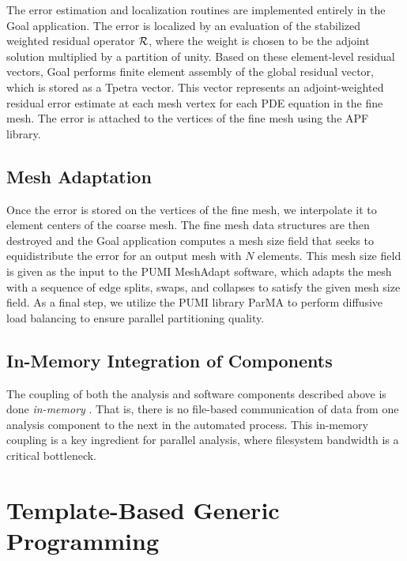 The error estimation and localization routines are implemented entirely in
the Goal application. The error is localized by an evaluation of the
stabilized weighted residual operator $\mathcal{R}$, where the weight is chosen to be
the adjoint solution multiplied by a partition of unity. Based on these
element-level residual vectors, Goal performs finite element assembly
of the global residual vector, which is stored as a Tpetra vector. This
vector represents an adjoint-weighted residual error estimate at each mesh
vertex for each PDE equation in the fine mesh. The error is attached to the
vertices of the fine mesh using the APF library.

\subsection{Mesh Adaptation}

Once the error is stored on the vertices of the fine mesh, we interpolate
it to element centers of the coarse mesh. The fine mesh data structures are
then destroyed and the Goal application computes a mesh size field that
seeks to equidistribute the error for an output mesh with $N$ elements. This
mesh size field is given as the input to the PUMI MeshAdapt software, which
adapts the mesh with a sequence of edge splits, swaps, and collapses
\cite{li20053d, alauzet2006parallel} to satisfy the given mesh size field.
As a final step, we utilize the PUMI library ParMA
\cite{smith2015parma, diamond2017dynamic}
to perform diffusive
load balancing to ensure parallel partitioning quality.

\subsection{In-Memory Integration of Components}

The coupling of both the analysis and
software components described above is done \emph{in-memory}
\cite{smith2016memory}. That is, there is no file-based communication of
data from one analysis component to the next in the automated process.
This in-memory coupling is a key ingredient for parallel analysis,
where filesystem bandwidth is a critical bottleneck.

\section{Template-Based Generic Programming}
\label{sec:tbgp}

